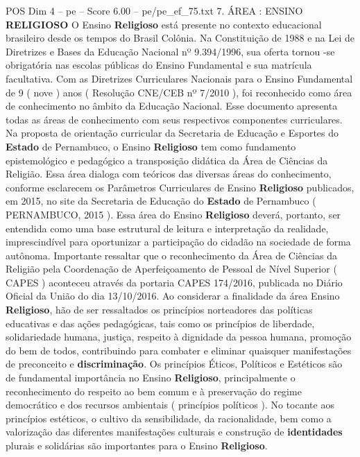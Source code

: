 \begin{textsample}{POS Dim 4 – pe – Score 6.00 – pe/pe\_ef\_75.txt}  \label{ex:f4_pos_278}
7.
ÁREA : ENSINO \textbf{RELIGIOSO} O Ensino \textbf{Religioso} está presente no contexto educacional brasileiro desde os tempos do Brasil Colônia.
Na Constituição de 1988 e na Lei de Diretrizes e Bases da Educação Nacional nº 9.394/1996, sua oferta tornou -se obrigatória nas escolas públicas do Ensino Fundamental e sua matrícula facultativa.
Com as Diretrizes Curriculares Nacionais para o Ensino Fundamental de 9 ( nove ) anos ( Resolução CNE/CEB nº 7/2010 ), foi reconhecido como área de conhecimento no âmbito da Educação Nacional.
Esse documento apresenta todas as áreas de conhecimento com seus respectivos componentes curriculares.
Na proposta de orientação curricular da Secretaria de Educação e Esportes do \textbf{Estado} de Pernambuco, o Ensino \textbf{Religioso} tem como fundamento epistemológico e pedagógico a transposição didática da Área de Ciências da Religião.
Essa área dialoga com teóricos das diversas áreas do conhecimento, conforme esclarecem os Parâmetros Curriculares de Ensino \textbf{Religioso} publicados, em 2015, no site da Secretaria de Educação do \textbf{Estado} de Pernambuco ( PERNAMBUCO, 2015 ).
Essa área do Ensino \textbf{Religioso} deverá, portanto, ser entendida como uma base estrutural de leitura e interpretação da realidade, imprescindível para oportunizar a participação do cidadão na sociedade de forma autônoma.
Importante ressaltar que o reconhecimento da Área de Ciências da Religião pela Coordenação de Aperfeiçoamento de Pessoal de Nível Superior ( CAPES ) aconteceu através da portaria CAPES 174/2016, publicada no Diário Oficial da União do dia 13/10/2016.
Ao considerar a finalidade da área Ensino \textbf{Religioso}, hão de ser ressaltados os princípios norteadores das políticas educativas e das ações pedagógicas, tais como os princípios de liberdade, solidariedade humana, justiça, respeito à dignidade da pessoa humana, promoção do bem de todos, contribuindo para combater e eliminar quaisquer manifestações de preconceito e \textbf{discriminação}.
Os princípios Éticos, Políticos e Estéticos são de fundamental importância no Ensino \textbf{Religioso}, principalmente o reconhecimento do respeito ao bem comum e à preservação do regime democrático e dos recursos ambientais ( princípios políticos ).
No tocante aos princípios estéticos, o cultivo da sensibilidade, da racionalidade, bem como a valorização das diferentes manifestações culturais e construção de \textbf{identidades} plurais e solidárias são importantes para o Ensino \textbf{Religioso}.

\end{textsample}
